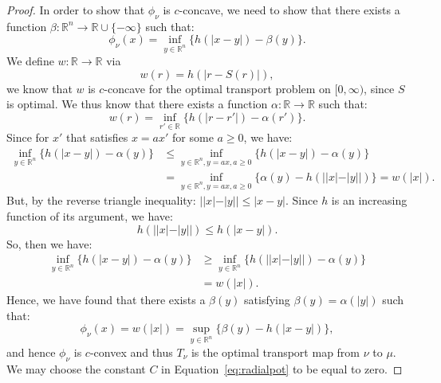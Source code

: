 \documentclass{amsart}
\theoremstyle{lemma}
\theoremstyle{remark}
\begin{document}
\begin{proof}
In order to show that $\phi_{\nu}$ is $c$-concave, we need to show that there exists a function $\beta: \mathbb{R}^n \rightarrow \mathbb{R} \cup \{-\infty \}$ such that:
\begin{equation}
\phi_{\nu}(x) = \inf_{y \in \mathbb{R}^{n}} \{ h(\vert x - y \vert) - \beta(y) \}.
\end{equation}
We define $w:\mathbb{R} \rightarrow \mathbb{R}$ via
\begin{equation}
w(r) = h(\vert r - S(r) \vert),
\end{equation}
we know that $w$ is $c$-concave for the optimal transport problem on $[0, \infty)$, since $S$ is optimal. We thus know that there exists a function $\alpha: \mathbb{R} \rightarrow \mathbb{R}$ such that:
\begin{equation}
w(r) = \inf_{r' \in \mathbb{R}} \{ h(\vert r - r' \vert) - \alpha(r') \}.
\end{equation}
Since for $x'$ that satisfies $x = a x'$ for some $a \geq 0$, we have:
\begin{align}
\inf_{y \in \mathbb{R}^{n}} \{ h(\vert x - y \vert)-\alpha(y)  \} &\leq \inf_{y \in \mathbb{R}^{n}, y = ax, a\geq 0} \{ h(\vert x - y \vert) - \alpha(y) \} \\
&= \inf_{y \in \mathbb{R}^{n}, y = ax, a\geq 0} \{ \alpha(y) - h(\vert \vert x \vert - \vert y \vert \vert) \} = w(\vert x \vert).
\end{align}
But, by the reverse triangle inequality: $\vert \vert x \vert - \vert y \vert \vert \leq \vert x - y \vert$. Since $h$ is an increasing function of its argument, we have:
\begin{equation}
h(\vert \vert x \vert - \vert y \vert \vert) \leq h(\vert x - y \vert).
\end{equation}
So, then we have:
\begin{align}
\inf_{y \in \mathbb{R}^{n}} \{ h(\vert x - y \vert)- \alpha(y) \} &\geq \inf_{y \in \mathbb{R}^{n}} \{ h(\vert  \vert x \vert - \vert y \vert \vert) -\alpha(y)\} \\
&= w(\vert x \vert).
\end{align}
Hence, we have found that there exists a $\beta(y)$ satisfying $\beta(y) = \alpha(\vert y \vert)$ such that:
\begin{equation}
\phi_{\nu}(x) = w(\vert x \vert) = \sup_{y \in \mathbb{R}^n} \{ \beta(y) - h( \vert x -y \vert) \},
\end{equation}
and hence $\phi_{\nu}$ is $c$-convex and thus $T_{\nu}$ is the optimal transport map from $\nu$ to $\mu$. We may choose the constant $C$ in Equation~\eqref{eq:radialpot} to be equal to zero.



\end{proof}
\end{document}
